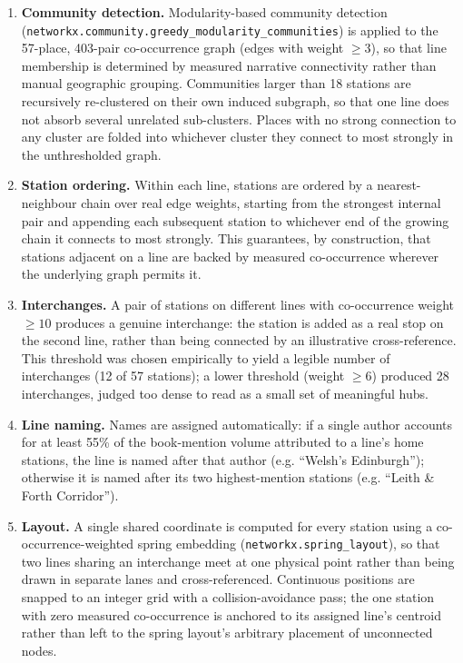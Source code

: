 \documentclass[logo,msc]{infthesis}
\begin{document}
\begin{enumerate}
  \item \textbf{Community detection.} Modularity-based community detection (\texttt{networkx.community.greedy\_modularity\_communities}) is applied to the 57-place, 403-pair co-occurrence graph (edges with weight $\geq 3$), so that line membership is determined by measured narrative connectivity rather than manual geographic grouping. Communities larger than 18 stations are recursively re-clustered on their own induced subgraph, so that one line does not absorb several unrelated sub-clusters. Places with no strong connection to any cluster are folded into whichever cluster they connect to most strongly in the unthresholded graph.
  \item \textbf{Station ordering.} Within each line, stations are ordered by a nearest-neighbour chain over real edge weights, starting from the strongest internal pair and appending each subsequent station to whichever end of the growing chain it connects to most strongly. This guarantees, by construction, that stations adjacent on a line are backed by measured co-occurrence wherever the underlying graph permits it.
  \item \textbf{Interchanges.} A pair of stations on different lines with co-occurrence weight $\geq 10$ produces a genuine interchange: the station is added as a real stop on the second line, rather than being connected by an illustrative cross-reference. This threshold was chosen empirically to yield a legible number of interchanges (12 of 57 stations); a lower threshold (weight $\geq 6$) produced 28 interchanges, judged too dense to read as a small set of meaningful hubs.
  \item \textbf{Line naming.} Names are assigned automatically: if a single author accounts for at least 55\% of the book-mention volume attributed to a line's home stations, the line is named after that author (e.g. ``Welsh's Edinburgh''); otherwise it is named after its two highest-mention stations (e.g. ``Leith \& Forth Corridor'').
  \item \textbf{Layout.} A single shared coordinate is computed for every station using a co-occurrence-weighted spring embedding (\texttt{networkx.spring\_layout}), so that two lines sharing an interchange meet at one physical point rather than being drawn in separate lanes and cross-referenced. Continuous positions are snapped to an integer grid with a collision-avoidance pass; the one station with zero measured co-occurrence is anchored to its assigned line's centroid rather than left to the spring layout's arbitrary placement of unconnected nodes.

\end{enumerate}
\end{document}
